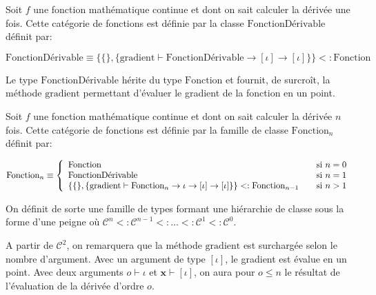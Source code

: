 \begin{mydef}\label{def:chap1_derivfcn}
  Soit $f$ une fonction mathématique continue et dont on sait calculer
  la dérivée une fois. Cette catégorie de fonctions est définie par la
  classe $\text{FonctionDérivable}$ définit par:

  \begin{equation}
    \text{FonctionDérivable} \equiv \{ \{ \}, \{ \text{gradient}
    \vdash \text{FonctionDérivable} \rightarrow [\iota] \rightarrow [\iota] \} \} <: \text{Fonction}
  \end{equation}

  Le type $\text{FonctionDérivable}$ hérite du type $\text{Fonction}$
  et fournit, de surcroît, la méthode $\text{gradient}$ permettant
  d'évaluer le gradient de la fonction en un point.
\end{mydef}

\begin{mydef}\label{def:chap1_nderivfcn}
  Soit $f$ une fonction mathématique continue et dont on sait calculer
  la dérivée $n$ fois. Cette catégorie de fonctions est définie par la
  famille de classe $\text{Fonction}_n$ définit par:

  \begin{equation}
  \begin{split}
    \text{Fonction}_n \equiv
    \left\{
    \begin{array}{l l}
      \text{Fonction} & \quad \text{si $n = 0$}\\
      \text{FonctionDérivable} & \quad \text{si $n = 1$}\\
      \{ \{ \}, \{ \text{gradient} \vdash \text{Fonction}_n \rightarrow \iota \rightarrow [\iota] \rightarrow [\iota] \} \} <: \text{Fonction}_{n-1} & \quad \text{si $n > 1$}\\
    \end{array} \right.
  \end{split}
  \end{equation}

  On définit de sorte une famille de types formant une hiérarchie de
  classe sous la forme d'une peigne où $\mathcal{C}^n <:
  \mathcal{C}^{n-1} <: \dotsc <: \mathcal{C}^1 <: \mathcal{C}^0$.

  A partir de $\mathcal{C}^2$, on remarquera que la méthode
  $\text{gradient}$ est surchargée selon le nombre d'argument. Avec un
  argument de type $[\iota]$, le gradient est évalue en un point. Avec
  deux arguments $o \vdash \iota$ et $\mathbf{x} \vdash [\iota]$, on
  aura pour $o \leq n$ le résultat de l'évaluation de la dérivée d'ordre
  $o$.
\end{mydef}


